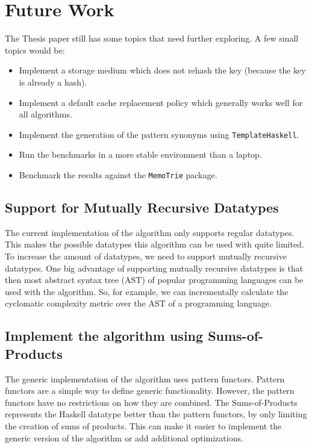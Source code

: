 \section{Future Work}




The Thesis paper still has some topics that need further exploring. A few small topics would be: 
\begin{itemize}
  \item Implement a storage medium which does not rehash the key (because the key is already a hash).
  \item Implement a default cache replacement policy which generally works well for all algorithms. 
  \item Implement the generation of the pattern synonyms using \texttt{TemplateHaskell}.
  \item Run the benchmarks in a more stable environment than a laptop.
  \item Benchmark the results against the \texttt{MemoTrie} package.
\end{itemize}

\subsection{Support for Mutually Recursive Datatypes}
The current implementation of the algorithm only supports regular datatypes. This makes the possible datatypes this algorithm can be used with quite limited. To increase the amount of datatypes, we need to support mutually recursive datatypes. One big advantage of supporting mutually recursive datatypes is that then most abstract syntax tree (AST) of popular programming languages can be used with the algorithm. So, for example, we can incrementally calculate the cyclomatic complexity metric over the AST of a programming language. 

\subsection{Implement the algorithm using Sums-of-Products}
The generic implementation of the algorithm uses pattern functors. Pattern functors are a simple way to define generic functionality. However, the pattern functors have no restrictions on how they are combined. The Sums-of-Products represents the Haskell datatype better than the pattern functors, by only limiting the creation of sums of products. This can make it easier to implement the generic version of the algorithm or add additional optimizations.

